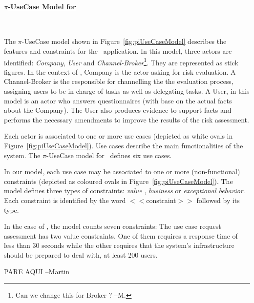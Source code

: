 \paragraph{\underline{$\pi$-UseCase Model for \FlyingPig}}~

The $\pi$-UseCase model shown in Figure~\ref{fig:piUseCaseModel} describes the features and constraints for the \FlyingPig\ application. 
In this model, three actors are identified: \textit{Company}, \textit{User} and \textit{Channel-Broker}\footnote{\color{red} Can we change this for Broker ? --M.}. 
They are represented as stick figures.
In the context of \FlyingPig, Company is the actor asking for risk evaluation.
A Channel-Broker is the responsible for channelling the the evaluation process, assigning users to be in charge of tasks as well as delegating tasks. 
A User, in this model is an actor who answers questionnaires (with base on the actual facts about the Company).
The User also produces evidence to support facts and performs the necessary amendments to improve the results of the risk assessment.

Each actor is associated to one or more use cases (depicted as white ovals in Figure~\ref{fig:piUseCaseModel}). 
Use cases describe the main functionalities of the system.
The $\pi$-UseCase model for \FlyingPig\ defines six use cases. 

In our model, each use case may be associated to one or more (non-functional) constraints (depicted as coloured ovals in Figure~\ref{fig:piUseCaseModel}). 
The model defines three types of constraints: \textit{value} , \textit{business} or \textit{exceptional behavior}. 
Each constraint is identified by the word $<<$\textsf{constraint}$>>$ followed by its type.

In the case of \FlyingPig, the model counts seven constraints:
The use case \textsf{request assessment} has two value constraints.
One of them requires a response time of less than 30 seconds while the other requires that the system's infrastructure should be prepared to deal with, at least 200 users. 

PARE AQUI --Martin


